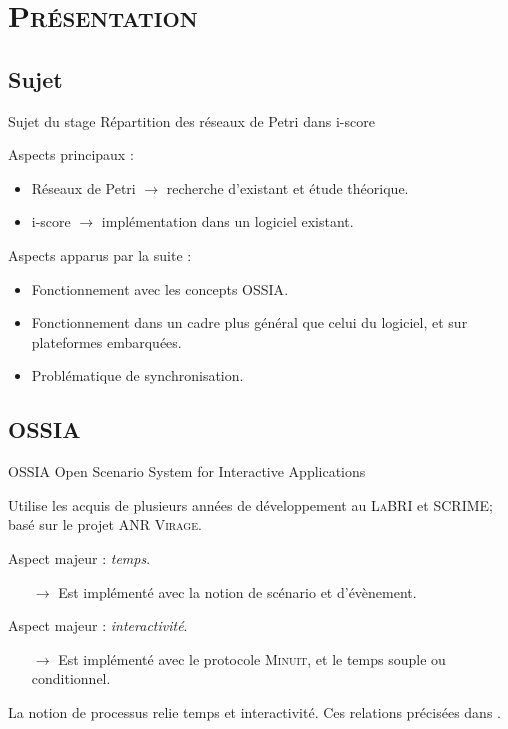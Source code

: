 \section{\scshape Présentation}
\subsection{Sujet}
\begin{frame}{Sujet du stage}
	{\large Répartition des réseaux de Petri dans i-score}
	
	Aspects principaux : 
	\begin{itemize}
		\item Réseaux de Petri $\rightarrow$ recherche d'existant et étude théorique.
		\item i-score $\rightarrow$ implémentation dans un logiciel existant.
	\end{itemize} 
	\vspace{1em}
	Aspects apparus par la suite : 
	\begin{itemize}
		\item Fonctionnement avec les concepts {OSSIA}.
		\item Fonctionnement dans un cadre plus général que celui du logiciel, et sur plateformes embarquées.
		\item Problématique de synchronisation.
	\end{itemize}
	
\end{frame}

\subsection{OSSIA}
\begin{frame}{OSSIA}
	{\large Open Scenario System for Interactive Applications}
	
	Utilise les acquis de plusieurs années de développement au \textsc{LaBRI} et \textsc{SCRIME}; basé sur le projet \textsc{ANR Virage}.
	
	\vspace{1em}
	Aspect majeur : \emph{temps}.
	\begin{itemize}
		\item[$\rightarrow$] Est implémenté avec la notion de scénario et d'évènement.
	\end{itemize}
	
	Aspect majeur : \emph{interactivité}.
	\begin{itemize}
		\item[$\rightarrow$] Est implémenté avec le protocole \textsc{Minuit}, et le temps souple ou conditionnel.
	\end{itemize}
		
	La notion de processus relie temps et interactivité. Ces relations précisées dans \cite{hogue2014ossia}.
\end{frame}

